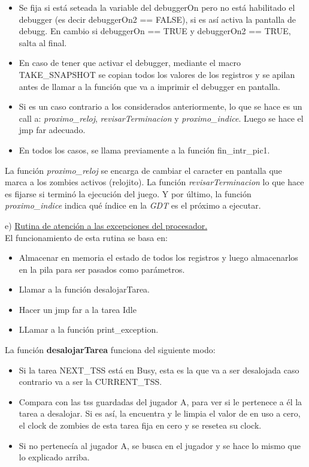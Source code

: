 \documentclass[a4paper]{article}
\begin{document}
\begin{itemize}
\item Se fija si est\'a seteada la variable del debuggerOn pero no est\'a habilitado el debugger (es decir debuggerOn2 == FALSE), si es as\'i activa la pantalla de debugg. En cambio si debuggerOn == TRUE y debuggerOn2 == TRUE, salta al final.
\item En caso de tener que activar el debugger, mediante el macro TAKE_SNAPSHOT se copian todos los valores de los registros y se apilan antes de llamar a la funci\'on que va a imprimir el debugger en pantalla.
\item Si es un caso contrario a los considerados anteriormente, lo que se hace es un call a: \textit{proximo_reloj}, \textit{revisarTerminacion} y \textit{proximo_indice}. Luego se hace el jmp far adecuado.
\item En todos los casos, se llama previamente a la funci\'on fin_intr_pic1.
\end{itemize}

La funci\'on \textit{proximo_reloj} se encarga de cambiar el caracter en pantalla que marca a los zombies activos (relojito). La funci\'on  \textit{revisarTerminacion} lo que hace es fijarse si termin\'o la ejecuci\'on del juego. Y por \'ultimo, la funci\'on \textit{proximo_indice} indica qu\'e \'indice en la \emph{GDT} es el pr\'oximo a ejecutar.


\bigskip

{\large e)} \underline{Rutina de atenci\'on a las excepciones del procesador.}\\

El funcionamiento de esta rutina se basa en:

\begin{itemize}
\item Almacenar en memoria el estado de todos los registros y luego almacenarlos en la pila para ser pasados como par\'ametros.
\item Llamar a la funci\'on desalojarTarea.
\item Hacer un jmp far a la tarea Idle
\item LLamar a la funci\'on print_exception.
\end{itemize}
\bigskip

La funci\'on \textbf{desalojarTarea} funciona del siguiente modo:

\begin{itemize}
\item Si la tarea NEXT_TSS est\'a en Busy, esta es la que va a ser desalojada caso contrario va a ser la CURRENT_TSS.
\item Compara con las tss guardadas del jugador A, para ver si le pertenece a \'el la tarea a desalojar. Si es as\'i, la encuentra y le limpia el valor de en uso a cero, el clock de zombies de esta tarea fija en cero y se resetea su clock.
\item Si no pertenec\'ia al jugador A, se busca en el jugador y se hace lo mismo que lo explicado arriba.
\end{itemize}
\bigskip
\end{document}
